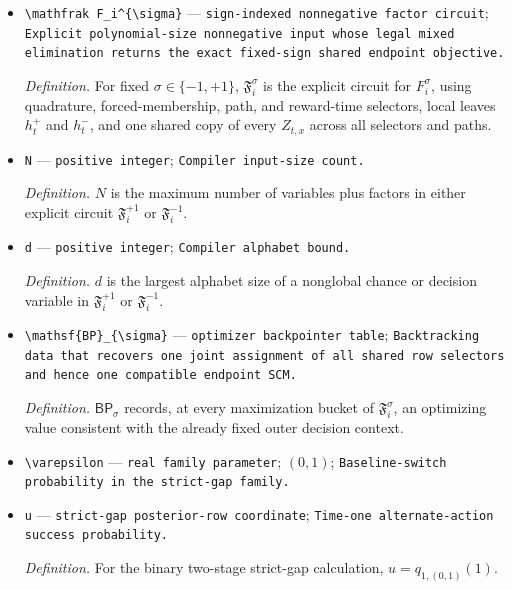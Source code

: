 \documentclass{article}
\begin{document}
\begin{itemize}
  \item \texttt{\textbackslash{}\allowbreak{}mathfrak F\_\allowbreak{}i\textasciicircum{}\{\textbackslash{}\allowbreak{}sigma\}\allowbreak{}} --- \texttt{sign-\allowbreak{}indexed nonnegative factor circuit}; \texttt{Explicit polynomial-\allowbreak{}size nonnegative input whose legal mixed elimination returns the exact fixed-\allowbreak{}sign shared endpoint objective.}
  \par\smallskip\noindent\emph{Definition.} For fixed \(\sigma\in\{-1,+1\}\), \(\mathfrak F_i^{\sigma}\) is the explicit circuit for \(F_i^{\sigma}\), using quadrature, forced-membership, path, and reward-time selectors, local leaves \(h_t^{+}\) and \(h_t^{-}\), and one shared copy of every \(Z_{t,x}\) across all selectors and paths.
  \item \texttt{N} --- \texttt{positive integer}; \texttt{Compiler input-\allowbreak{}size count.}
  \par\smallskip\noindent\emph{Definition.} \(N\) is the maximum number of variables plus factors in either explicit circuit \(\mathfrak F_i^{+1}\) or \(\mathfrak F_i^{-1}\).
  \item \texttt{d} --- \texttt{positive integer}; \texttt{Compiler alphabet bound.}
  \par\smallskip\noindent\emph{Definition.} \(d\) is the largest alphabet size of a nonglobal chance or decision variable in \(\mathfrak F_i^{+1}\) or \(\mathfrak F_i^{-1}\).
  \item \texttt{\textbackslash{}\allowbreak{}mathsf\{BP\}\allowbreak{}\_\allowbreak{}\{\textbackslash{}\allowbreak{}sigma\}\allowbreak{}} --- \texttt{optimizer backpointer table}; \texttt{Backtracking data that recovers one joint assignment of all shared row selectors and hence one compatible endpoint SCM.}
  \par\smallskip\noindent\emph{Definition.} \(\mathsf{BP}_{\sigma}\) records, at every maximization bucket of \(\mathfrak F_i^{\sigma}\), an optimizing value consistent with the already fixed outer decision context.
  \item \texttt{\textbackslash{}\allowbreak{}varepsilon} --- \texttt{real family parameter}; \((0,1)\); \texttt{Baseline-\allowbreak{}switch probability in the strict-\allowbreak{}gap family.}
  \item \texttt{u} --- \texttt{strict-\allowbreak{}gap posterior-\allowbreak{}row coordinate}; \texttt{Time-\allowbreak{}one alternate-\allowbreak{}action success probability.}
  \par\smallskip\noindent\emph{Definition.} For the binary two-stage strict-gap calculation, \(u=q_{1,(0,1)}(1)\).

\end{itemize}
\end{document}
